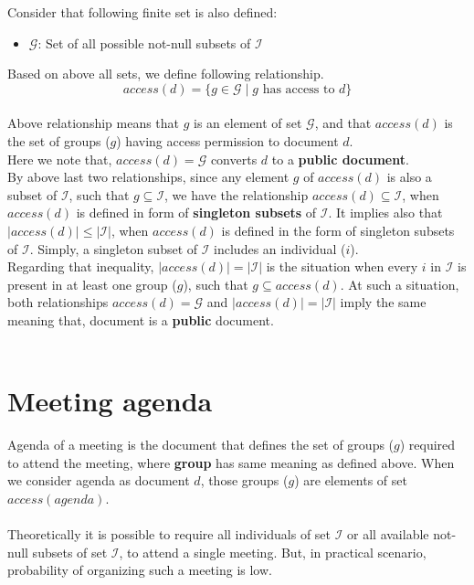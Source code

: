 \noindent
Consider that following finite set is also defined:
\begin{itemize}
    \item $\mathcal{G}$: Set of all possible not-null subsets of $\mathcal{I}$
\end{itemize}
Based on above all sets, we define following relationship.
\[ access(d) = \{ g \in \mathcal{G} \mid g \text{ has access to } d \} \] \\ 
\noindent
Above relationship means that $g$ is an element of set $\mathcal{G}$, and that $access(d)$ is the set of groups ($g$) having access permission to document $d$.\\ 
Here we note that, $access(d) = \mathcal{G}$ converts $d$ to a \textbf{public document}. \\ 

By above last two relationships, since any element $g$ of $access(d)$ is also a subset of $\mathcal{I}$, such that $g \subseteq \mathcal{I}$, we have the relationship $access(d) \subseteq \mathcal{I}$, when $access(d)$ is defined in form of \textbf{singleton subsets} of $\mathcal{I}$. It implies also that $|access(d)| \leq |\mathcal{I}|$, when $access(d)$ is defined in the form of singleton subsets of $\mathcal{I}$. Simply, a singleton subset of $\mathcal{I}$ includes an individual ($i$).  \\
Regarding that inequality, $|access(d)| = |\mathcal{I}|$ is the situation when every $i$ in $\mathcal{I}$ is present in at least one group ($g$), such that $g \subseteq access(d)$. At such a situation, both relationships $access(d) = \mathcal{G}$ and $|access(d)| = |\mathcal{I}|$ imply the same meaning that, document is a \textbf{public} document.\\ \\

\section{Meeting agenda}
\noindent
Agenda of a meeting is the document that defines the set of groups ($g$) required to attend the meeting, where \textbf{group} has same meaning as defined above.
When we consider agenda as document $d$, those groups ($g$) are elements of set $access(agenda)$.\\ \\
Theoretically it is possible to require all individuals of set $\mathcal{I}$ or all available not-null subsets of set $\mathcal{I}$, to attend a single meeting. But, in practical scenario, probability of organizing such a meeting is low. \\ \\

